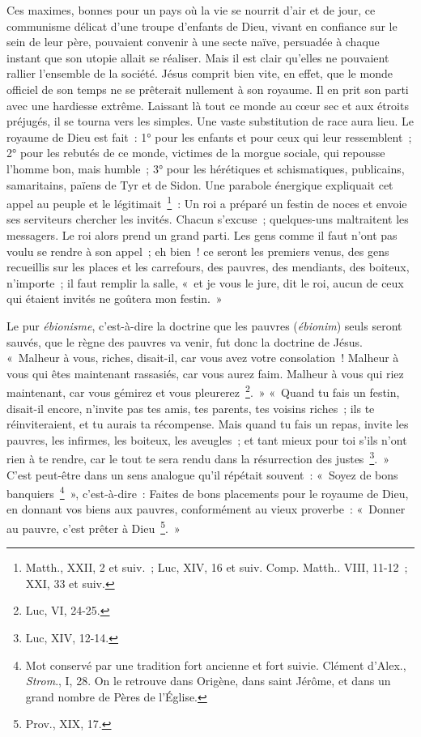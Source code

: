 \documentclass[french,twoside]{book} %
\newcommand\chaptercont{} %
\begin{document}
\chaptercont
\noindent Ces maximes, bonnes pour un pays où la vie se nourrit d’air et de jour, ce communisme délicat d’une troupe d’enfants de Dieu, vivant en confiance sur le sein de leur père, pouvaient convenir à une secte naïve, persuadée à chaque instant que son utopie allait se réaliser. Mais il est clair qu’elles ne pouvaient rallier l’ensemble de la société. Jésus comprit bien vite, en effet, que le monde officiel de son temps ne se prêterait nullement à son royaume. Il en prit son parti avec une hardiesse extrême. Laissant là tout ce monde au cœur sec et aux étroits préjugés, il se tourna vers les simples. Une vaste substitution de race aura lieu. Le royaume de Dieu est fait : 1° pour les enfants et pour ceux qui leur ressemblent ; 2° pour les rebutés de ce monde, victimes de la morgue sociale, qui repousse l’homme bon, mais humble ; 3° pour les hérétiques et schismatiques, publicains, samaritains, païens de Tyr et de Sidon. Une parabole énergique expliquait cet appel au peuple et le légitimait \footnote{Matth., XXII, 2 et suiv. ; Luc, XIV, 16 et suiv. Comp. Matth.. VIII, 11-12 ; XXI, 33 et suiv.} : Un roi a préparé un festin de noces et envoie ses serviteurs chercher les invités. Chacun s’excuse ; quelques-uns maltraitent les messagers. Le roi alors prend un grand parti. Les gens comme il faut n’ont pas voulu se rendre à son appel ; eh bien ! ce seront les premiers venus, des gens recueillis sur les places et les carrefours, des pauvres, des mendiants, des boiteux, n’importe ; il faut remplir la salle, « et je vous le jure, dit le roi, aucun de ceux qui étaient invités ne goûtera mon festin. »\par
Le pur {\itshape ébionisme}, c’est-à-dire la doctrine que les pauvres ({\itshape ébionim}) seuls seront sauvés, que le règne des pauvres va venir, fut donc la doctrine de Jésus. « Malheur à vous, riches, disait-il, car vous avez votre consolation ! Malheur à vous qui êtes maintenant rassasiés, car vous aurez faim. Malheur à vous qui riez maintenant, car vous gémirez et vous pleurerez \footnote{Luc, VI, 24-25.}. » « Quand tu fais un festin, disait-il encore, n’invite pas tes amis, tes parents, tes voisins riches ; ils te réinviteraient, et tu aurais ta récompense. Mais quand tu fais un repas, invite les pauvres, les infirmes, les boiteux, les aveugles ; et tant mieux pour toi s’ils n’ont rien à te rendre, car le tout te sera rendu dans la résurrection des justes \footnote{Luc, XIV, 12-14.}. » C’est peut-être dans un sens analogue qu’il répétait souvent : « Soyez de bons banquiers \footnote{ Mot conservé par une tradition fort ancienne et fort suivie. Clément d’Alex., {\itshape Strom}., I, 28. On le retrouve dans Origène, dans saint Jérôme, et dans un grand nombre de Pères de l’Église.} », c’est-à-dire : Faites de bons placements pour le royaume de Dieu, en donnant vos biens aux pauvres, conformément au vieux proverbe : « Donner au pauvre, c’est prêter à Dieu \footnote{Prov., XIX, 17.}. »\par
\end{document}
